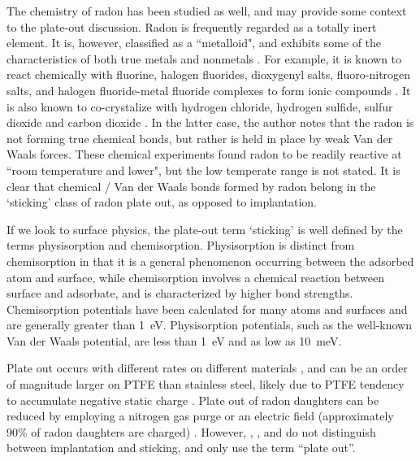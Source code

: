 The chemistry of radon has been studied as well, and may provide some context to the plate-out discussion. Radon is frequently regarded as a totally inert element. It is, however, classified as a ``metalloid", and exhibits some of the characteristics of both true metals and nonmetals  \cite{stein1987}. For example, it is known to react chemically with fluorine, halogen fluorides, dioxygenyl salts, fluoro-nitrogen salts, and halogen fluoride-metal fluoride complexes to form ionic compounds \cite{stein1982}. It is also known to co-crystalize with hydrogen chloride, hydrogen sulfide, sulfur dioxide and carbon dioxide \cite{stein1987}. In the latter case, the author notes that the radon is not forming true chemical bonds, but rather is held in place by weak Van der Waals forces. These chemical experiments found radon to be readily reactive at ``room temperature and lower", but the low temperate range is not stated. It is clear that chemical / Van der Waals bonds formed by radon belong in the `sticking' class of radon plate out, as opposed to implantation.

If we look to surface physics, the plate-out term `sticking' is well defined by the terms physisorption and chemisorption. Physisorption is distinct from chemisorption in that it is a general phenomenon occurring between the adsorbed atom and surface, while chemisorption involves a chemical reaction between surface and adsorbate, and is characterized by higher bond strengths. Chemisorption potentials have been calculated for many atoms and surfaces \cite{HammerNorskov} and are generally greater than 1~eV. Physisorption potentials, such as the well-known Van der Waals potential, are less than 1~eV and as low as 10~meV. 

Plate out occurs with different rates on different materials \cite{Bigu1987}, and can be an order of magnitude larger on \ac{PTFE} than stainless steel, likely due to \ac{PTFE} tendency to accumulate negative static charge \cite{Morrison2017}. Plate out of radon daughters can be reduced by employing a nitrogen gas purge or an electric field (approximately 90\% of radon daughters are charged) \cite{Bruemmer2015}. However, \cite{Bigu1987}, \cite{Morrison2017}, and \cite{Bruemmer2015} do not distinguish between implantation and sticking, and only use the term ``plate out''. 


